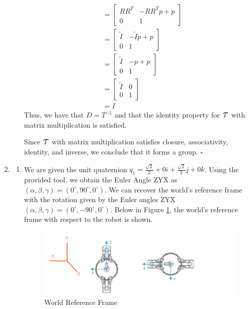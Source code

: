 \documentclass[11pt]{article}
\newcommand\Tau{\scalerel*{\tau}{T}}
\begin{document}
\begin{enumerate}[leftmargin=0.3in]
\begin{enumerate}
\begin{align*}
           &= \begin{bmatrix}
               \mathit{R} \mathit{R}^T & - \mathit{R} \mathit{R}^T \mathit{p} + \mathit{p}\\
               0 & 1
           \end{bmatrix} \\
           &= \begin{bmatrix}
               \tilde{\mathit{I}} & - \tilde{\mathit{I}} \mathit{p} + \mathit{p} \\
               0 & 1
           \end{bmatrix} \\
           &= \begin{bmatrix}
               \tilde{\mathit{I}} & -\mathit{p} + \mathit{p} \\
               0 & 1
           \end{bmatrix} \\
           &= \begin{bmatrix}
               \tilde{\mathit{I}} & \mathit{0} \\
               0 & 1
           \end{bmatrix} \\
           &= \mathit{I}
   \end{align*}
   Thus, we have that $\mathit{D} = \mathit{T}^{-1}$ and that the identity property for $\Tau$ with matrix multiplication is satisfied.

   Since $\Tau$ with matrix multiplication satisfies closure, associativity, identity, and inverse, we conclude that it forms a group. $\square$

   \end{enumerate} %
   
   \item %
   \begin{enumerate}
       \item We are given the unit quaternion $\mathit{q}_1 = \frac{\sqrt{2}}{2} + 0i + \frac{\sqrt{2}}{2}j + 0k$. Using the provided tool, we obtain the Euler Angle ZYX as $(\alpha, \beta, \gamma) = (0 ^\circ, 90 ^\circ, 0^\circ)$. We can recover the world's reference frame with the rotation given by the Euler angles ZYX $(\alpha, \beta, \gamma) = (0 ^\circ, -90 ^\circ, 0 ^\circ)$. Below in Figure \ref{fig:1}, the world's reference frame with respect to the robot is shown.

       \begin{figure}[H]
           \centering
           \includegraphics[width=16cm]{figures/Problem2.png}
               \caption{World Reference Frame}
               \label{fig:1}
           \end{figure}


\end{enumerate}
\end{enumerate}
\end{document}
